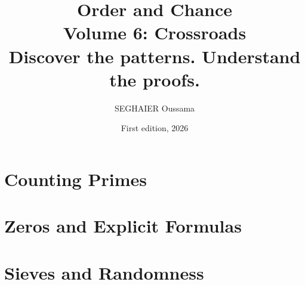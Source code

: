 \documentclass[11pt,openany]{book}
\title{\Huge\textbf{Order and Chance}\\[0.4em]\LARGE Volume 6: Crossroads\\[0.6em]
\Large Discover the patterns. Understand the proofs.}
\author{SEGHAIER Oussama}
\date{First edition, 2026}
\begin{document}
\frontmatter
\makecover
\maketitle

\tableofcontents

\mainmatter

\part{Counting Primes}





\part{Zeros and Explicit Formulas}


\part{Sieves and Randomness}





\end{document}
